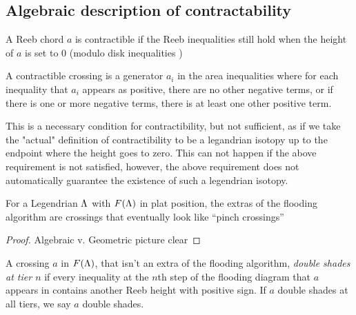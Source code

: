 \documentclass[11pt,oneside]{amsart}
\begin{document}
\subsection{Algebraic description of contractability}

\begin{definition}[Contractible]
    A Reeb chord $a$ is contractible if the Reeb inequalities still hold when the height of $a$ is set to $0$ (modulo disk inequalities \TODO)
\end{definition}

A contractible crossing is a generator $a_i$ in the area inequalities where for each inequality that $a_i$ appears as positive, there are no other negative terms, or if there is one or more negative terms, there is at least one other positive term.

This is a necessary condition for contractibility, but not sufficient, as if we take the "actual" definition of contractibility to be a legandrian isotopy up to the endpoint where the height goes to zero. This can not happen if the above requirement is not satisfied, however, the above requirement does not automatically guarantee the existence of such a legendrian isotopy. 

\begin{lemma}
    \label{lem:extradesc}
    For a Legendrian $\Lambda$ with $F(\Lambda)$ in plat position, the extras of the flooding algorithm are crossings that eventually look like ``pinch crossings''
\end{lemma}
\begin{proof}
    Algebraic v. Geometric picture clear \TODO
\end{proof}

\begin{definition}
    \label{def:doubleshade}
    A crossing $a$ in $F(\Lambda)$, that isn't an extra of the flooding algorithm, \textit{double shades at tier $n$} if every inequality at the $n$th step of the flooding diagram that $a$ appears in contains another Reeb height with positive sign. If $a$ double shades at all tiers, we say $a$ double shades.
\end{definition}

\end{document}
